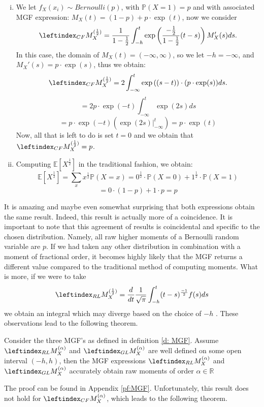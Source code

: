 \begin{example}
    \begin{enumerate}[(i)]
        \item We let \(f_X(x_i) \sim Bernoulli(p)\), with \(\mathbb{P}(X = 1) = p\) and with associated MGF expression: \(M_X(t) = (1 - p) + p \cdot\exp(t)\), now we consider \[\leftindex_{CF}{M}_X^{(\frac{1}{2})} = \frac{1}{1 - \frac{1}{2}}  \int_{-h}^{t} \exp\left(\frac{-\frac{1}{2}}{1 - \frac{1}{2}}(t-s)\right) M_X'(s) ds.\] In this case, the domain of \(M_X(t) = (-\infty, \infty)\), so we let \(-h = -\infty\), and \(M_X'(s) = p\cdot \exp(s)\), thus we obtain:
        \[\leftindex_{CF}{M}_X^{(\frac{1}{2})} = 2  \int_{-\infty}^{t} \exp\left((s-t)\right) \cdot (p\cdot \exp(s)) ds.\]
        \[= 2p \cdot \exp(-t) \int_{-\infty}^{t}\exp(2s) ds\] 
        \[= p\cdot \exp(-t) \left(\exp(2s) \Big|_{-\infty}^{t}\right) = p\cdot \exp(t)\]
        Now, all that is left to do is set \(t = 0\) and we obtain that \(\leftindex_{CF}{M}_X^{(\frac{1}{2})} = p\).
        \item Computing \(\mathbb{E}[{X^{\frac{1}{2}}}]\) in the traditional fashion, we obtain: 
        \[\mathbb{E}[{X^{\frac{1}{2}}}] = \sum_x x^{\frac{1}{2}} \mathbb{P}(X = x) = 0^{\frac{1}{2}} \cdot \mathbb{P}(X = 0) + 1^{\frac{1}{2}} \cdot \mathbb{P}(X = 1)\]
        \[ = 0 \cdot(1 - p) + 1 \cdot p = p\]
    \end{enumerate}
    
\end{example}
It is amazing and maybe even somewhat surprising that both expressions obtain the same result. Indeed, this result is actually more of a coincidence. It is important to note that this agreement of results is coincidental and specific to the chosen distribution. Namely, all raw higher moments of a Bernoulli random variable are \(p\). If we had taken any other distribution in combination with a moment of fractional order, it becomes highly likely that the MGF returns a different value compared to the traditional method of computing moments. What is more, if we were to take \[\leftindex_{RL}{M}_X^{(\frac{1}{2})}  = \frac{d}{dt} \frac{1}{\sqrt{\pi}}  \int_{-h}^{t} (t - s)^{\frac{-1}{2}} f(s) ds\] we obtain an integral which may diverge based on the choice of \(-h\) . These observations lead to the following theorem.

\begin{theorem}\label{t: MGF_accurate}
     Consider the three MGF's as defined in definition \ref{d: MGF}. Assume \(\leftindex_{RL}{M}_X^{(\alpha)}\) and \(\leftindex_{GL}{M}_X^{(\alpha)}\) are well defined on some open interval \((-h, h)\), then the MGF expressions \(\leftindex_{RL}{M}_X^{(\alpha)}\) and \(\leftindex_{GL}{M}_X^{(\alpha)}\) accurately obtain raw moments of order \(\alpha \in \mathbb{R}\)
    
\end{theorem}
The proof can be found in Appendix \ref{pf:MGF}.
\newline
Unfortunately, this result does not hold for \(\leftindex_{CF}{M}_X^{(\alpha)}\), which leads to the following theorem.

